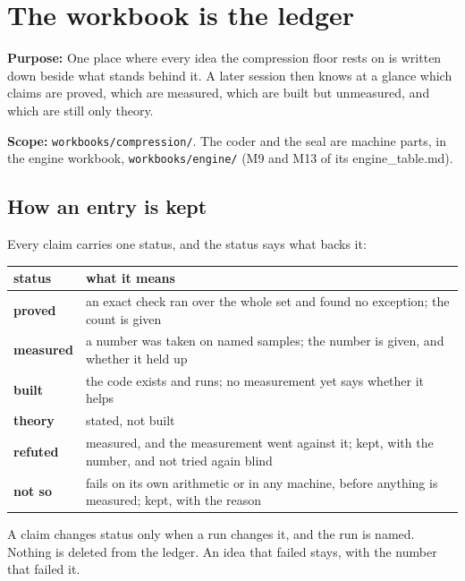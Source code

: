 \chapter{\texorpdfstring{The workbook is the ledger}{The workbook is the ledger}}
\label{chap:readme}

\textbf{Purpose:} One place where every idea the compression floor rests on is written down beside what stands behind it. A later session then knows at a glance which claims are proved, which are measured, which are built but unmeasured, and which are still only theory.

\textbf{Scope:} \texttt{workbooks/\allowbreak{}compression/\allowbreak{}}. The coder and the seal are machine parts, in the engine workbook, \texttt{workbooks/\allowbreak{}engine/\allowbreak{}} (M9 and M13 of its engine\_\allowbreak{}table.md).

\section{\texorpdfstring{How an entry is kept}{How an entry is kept}}

Every claim carries one status, and the status says what backs it:

{\small
\setlength{\tabcolsep}{6pt}
\begin{longtable}{>{\RaggedRight\arraybackslash}p{}>{\RaggedRight\arraybackslash}p{}}
\toprule
status & what it means \\
\midrule
\endhead
\textbf{proved} & an exact check ran over the whole set and found no exception; the count is given \\
\textbf{measured} & a number was taken on named samples; the number is given, and whether it held up \\
\textbf{built} & the code exists and runs; no measurement yet says whether it helps \\
\textbf{theory} & stated, not built \\
\textbf{refuted} & measured, and the measurement went against it; kept, with the number, and not tried again blind \\
\textbf{not so} & fails on its own arithmetic or in any machine, before anything is measured; kept, with the reason \\
\bottomrule
\end{longtable}
}

A claim changes status only when a run changes it, and the run is named. Nothing is deleted from the ledger. An idea that failed stays, with the number that failed it.

